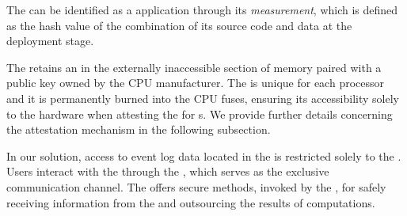\begin{newj}
{The  can be identified as a  application through its \emph{measurement}, which is defined as the hash value of the combination of its source code and data at the deployment stage.} 
\end{newj}
\begin{newj}
The  retains an  in the externally inaccessible section of memory paired with a public key owned by the CPU manufacturer. The  is unique for each processor and it is permanently burned into the CPU fuses, ensuring its accessibility solely to the hardware when attesting the  for s. We provide further details concerning the attestation mechanism in the following subsection.  %
\end{newj}
In our solution, access to event log data located in the  is restricted solely to the . Users interact with the  through the , which serves as the exclusive communication channel. The  offers secure methods, invoked by the , for safely receiving information from the  and outsourcing the results of computations. %

